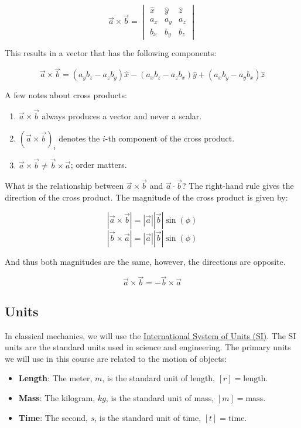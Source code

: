 \documentclass[11pt]{article}
\providecommand{\tightlist}{%
      \setlength{\itemsep}{0pt}\setlength{\parskip}{0pt}}
\begin{document}
\[\vec{a} \times \vec{b} = \begin{vmatrix} \hat{x} & \hat{y} & \hat{z} \\ a_x & a_y & a_z \\ b_x & b_y & b_z \end{vmatrix}\]

This results in a vector that has the following components:

\[\vec{a} \times \vec{b} = (a_yb_z - a_zb_y)\hat{x} - (a_xb_z-a_zb_x)\hat{y} + (a_xb_y - a_yb_x)\hat{z}\]

A few notes about cross products:

\begin{enumerate}
\def\labelenumi{\arabic{enumi}.}
\tightlist
\item
  \(\vec{a} \times \vec{b}\) always produces a vector and never a
  scalar.
\item
  \((\vec{a} \times \vec{b})_i\) denotes the \(i\)-th component of the
  cross product.
\item
  \(\vec{a} \times \vec{b} \neq \vec{b} \times \vec{a}\); order matters.
\end{enumerate}

What is the relationship between \(\vec{a} \times \vec{b}\) and
\(\vec{a} \cdot \vec{b}\)? The right-hand rule gives the direction of
the cross product. The magnitude of the cross product is given by:

\[|\vec{a} \times \vec{b}| = |\vec{a}||\vec{b}|\sin(\phi)\]
\[|\vec{b} \times \vec{a}| = |\vec{a}||\vec{b}|\sin(\phi)\]

And thus both magnitudes are the same, however, the directions are
opposite.

\[\vec{a} \times \vec{b} = -\vec{b} \times \vec{a}\]

    \subsection{Units}\label{units}

In classical mechanics, we will use the
\href{https://en.wikipedia.org/wiki/International_System_of_Units}{International
System of Units (SI)}. The SI units are the standard units used in
science and engineering. The primary units we will use in this course
are related to the motion of objects:

\begin{itemize}
\tightlist
\item
  \textbf{Length}: The meter, \(m\), is the standard unit of length,
  \([r] = \mathrm{length}\).
\item
  \textbf{Mass}: The kilogram, \(kg\), is the standard unit of mass,
  \([m] = \mathrm{mass}\).
\item
  \textbf{Time}: The second, \(s\), is the standard unit of time,
  \([t] = \mathrm{time}\).
\end{itemize}
\end{document}
